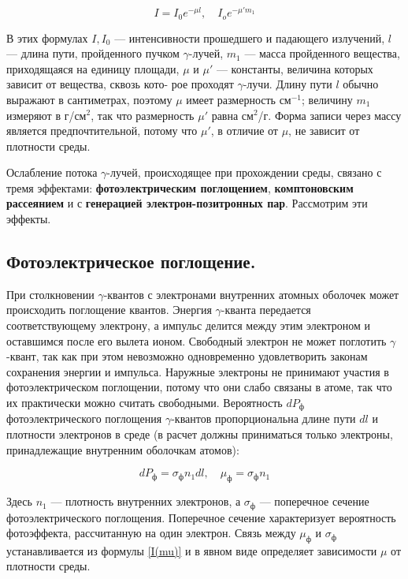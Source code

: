 \documentclass[12pt]{kiarticle}
\newcommand{\ga}{\ensuremath{\gamma}}
\begin{document}
	\begin{equation}\label{I(mu)}
	I = I_0 e^{-\mu l}, \quad I_o e^{-\mu 'm_1} 
	\end{equation}
	
	В этих формулах $ I, I_0 $ --- интенсивности прошедшего и падающего излучений, $ l $ --- длина пути, пройденного пучком \ga-лучей, $ m_1 $ ---
	масса пройденного вещества, приходящаяся на единицу площади, $ \mu $ и
	$ \mu' $ --- константы, величина которых зависит от вещества, сквозь кото-
	рое проходят \ga-лучи. Длину пути $ l $ обычно выражают в сантиметрах,
	поэтому $ \mu $ имеет размерность см$ ^{-1} $; величину $ m_1 $ измеряют в г/см$ ^2 $,
	так что размерность $ \mu' $ равна см$ ^2 $/г. Форма записи через массу является предпочтительной, потому что $ \mu' $, в отличие от $ \mu $, не зависит от плотности среды. 
	
	Ослабление потока \ga-лучей, происходящее при прохождении среды, связано с тремя эффектами: \textbf{фотоэлектрическим поглощением},
	\textbf{комптоновским рассеянием} и с \textbf{генерацией электрон-позитронных пар}. Рассмотрим эти эффекты.
	
	\subsection{Фотоэлектрическое поглощение.} При столкновении \ga-квантов с
	электронами внутренних атомных оболочек может происходить поглощение квантов. Энергия \ga-кванта передается соответствующему электрону, а импульс делится между этим электроном и оставшимся после
	его вылета ионом. Свободный электрон не может поглотить \ga-квант,
	так как при этом невозможно одновременно удовлетворить законам
	сохранения энергии и импульса. Наружные электроны не принимают участия в фотоэлектрическом поглощении, потому что они слабо
	связаны в атоме, так что их практически можно считать свободными.
	Вероятность $ dP_ф $ фотоэлектрического поглощения \ga-квантов пропорциональна длине пути $ dl $ и плотности электронов в среде (в расчет
	должны приниматься только электроны, принадлежащие внутренним
	оболочкам атомов):
	
	\begin{equation}\label{mu ph}
	dP_ф = \sigma_ф n_1 dl, \quad \mu_ф = \sigma_ф n_1
	\end{equation}
	
	Здесь $ n_1 $ --- плотность внутренних электронов, а $ \sigma_ф $ --- поперечное сечение фотоэлектрического поглощения. Поперечное сечение характеризует вероятность фотоэффекта, рассчитанную на один электрон. Связь между $ \mu_ф $ и $ \sigma_ф $ устанавливается из формулы \eqref{I(mu)} и в явном виде определяет зависимости $ \mu $ от плотности среды.
	
\end{document}
